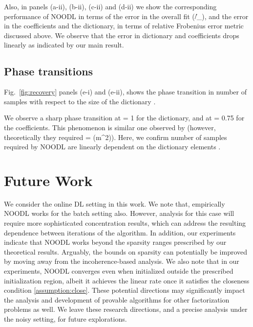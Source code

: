 \documentclass{article}
\newcommand{\Fr}{\text{F}}
\def\[#1\]{{$#1$}}
\def\b#1{{\mathbf{#1}}}
\begin{document}
Also, in panels (a-ii), (b-ii), (c-ii) and (d-ii) we show the corresponding performance of NOODL in terms of the error in the overall fit (\[{\|\b{Y} - \b{AX} \|_{\Fr}}/{\|\b{Y}\|_{\Fr}}\]), and the error in the coefficients and the dictionary, in terms of relative Frobenius error metric discussed above.  We observe that the error in dictionary and coefficients drops linearly as indicated by our main result.



















\vspace*{-6pt}
\subsection{Phase transitions }
\vspace*{-5pt}

Fig.~\ref{fig:recovery} panels (e-i) and (e-ii), shows the phase transition in number of samples with respect to the size of the dictionary \[m\].

We observe a sharp phase transition at \[\tfrac{p}{m} = 1\] for the dictionary, and at \[\tfrac{p}{m} = 0.75\] for the coefficients. This phenomenon is similar one observed by \cite{Agarwal14} (however, theoretically they required \[p = (m^2)\]). Here, we confirm number of samples required by NOODL are linearly dependent on the dictionary elements \[m\].

\vspace*{-6pt}
\section{Future Work}
\vspace{-7pt}
We consider the online DL setting in this work. We note that, empirically NOODL works for the batch setting also. However, analysis for this case will require more sophisticated concentration results, which can address the resulting dependence between iterations of the algorithm. In addition, our experiments indicate that NOODL works beyond the sparsity ranges prescribed by our theoretical results. Arguably, the bounds on sparsity can potentially be improved by moving away from the incoherence-based analysis.  We also note that in our experiments, NOODL converges even when initialized outside the prescribed initialization region, albeit it achieves the linear rate once it satisfies the closeness condition \ref{assumption:close}. These potential directions may significantly impact the analysis and development of provable algorithms for other factorization problems as well. We leave these research directions, and a precise analysis under the noisy setting, for future explorations.
\vspace*{-6pt}
\end{document}
